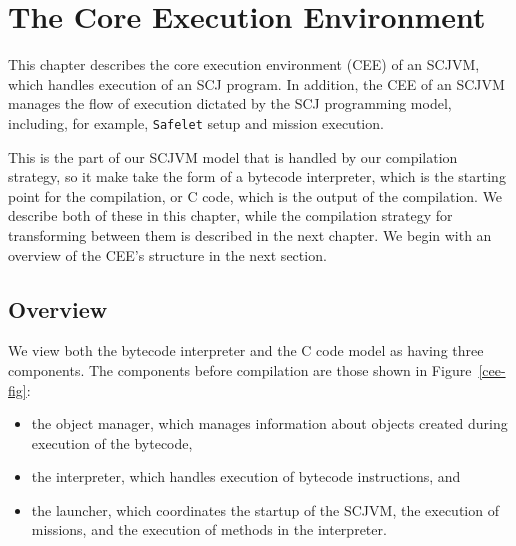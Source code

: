 \chapter{The Core Execution Environment}
\label{cee-chapter}

This chapter describes the core execution environment (CEE) of an
SCJVM, which handles execution of an SCJ program.
In addition, the CEE of an SCJVM manages the flow of execution
dictated by the SCJ programming model, including, for example,
\texttt{Safelet} setup and mission execution.

This is the part of our SCJVM model that is handled by our compilation
strategy, so it make take the form of a bytecode interpreter, which is
the starting point for the compilation, or C code, which is the output
of the compilation.
We describe both of these in this chapter, while the compilation
strategy for transforming between them is described in the next
chapter.
We begin with an overview of the CEE's structure in the next section.

\section{Overview}

We view both the bytecode interpreter and the C code model as having
three components.
The components before compilation are those shown in
Figure~\ref{cee-fig}:
\begin{itemize}
\item the object manager, which manages information about objects
  created during execution of the bytecode,
\item the interpreter, which handles execution of bytecode
  instructions, and
\item the launcher, which coordinates the startup of the SCJVM, the
  execution of missions, and the execution of methods in the
  interpreter.
\end{itemize}

